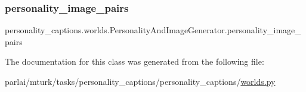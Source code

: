 \subsubsection{\texorpdfstring{personality\+\_\+image\+\_\+pairs}{personality\_image\_pairs}}
{\footnotesize\ttfamily personality\+\_\+captions.\+worlds.\+Personality\+And\+Image\+Generator.\+personality\+\_\+image\+\_\+pairs}



The documentation for this class was generated from the following file\+:\begin{DoxyCompactItemize}
\item 
parlai/mturk/tasks/personality\+\_\+captions/personality\+\_\+captions/\hyperlink{parlai_2mturk_2tasks_2personality__captions_2personality__captions_2worlds_8py}{worlds.\+py}\end{DoxyCompactItemize}
